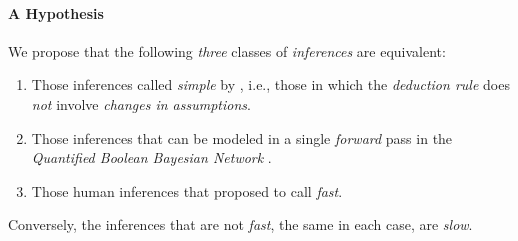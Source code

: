 \documentclass[11pt]{article}
\begin{document}
\paragraph{A Hypothesis}
We propose that the following {\em three} classes of {\em inferences} are equivalent:
\begin{enumerate}
    \item Those inferences called {\em simple} by \cite{PrawitzNaturalDeduction}, i.e., those in which the {\em deduction rule} does {\em not} involve {\em changes in assumptions}.
    \item Those inferences that can be modeled in a single {\em forward} pass in the {\em Quantified Boolean Bayesian Network} \cite{Coppola2024}.
    \item Those human inferences that \cite{Kahneman2011ThinkingFast} proposed to call {\em fast}.
\end{enumerate}
Conversely, the inferences that are not {\em fast}, the same in each case, are {\em slow}.
% 
% 
\end{document}
